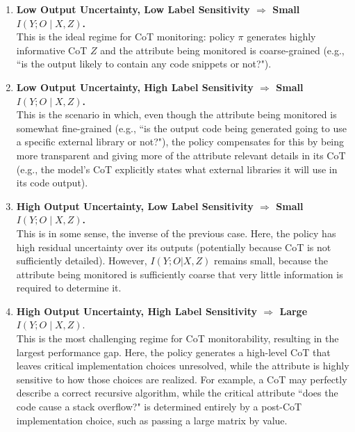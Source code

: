 \documentclass{article}
\theoremstyle{plain}
\begin{document}
\begin{enumerate}
\item \textbf{Low Output Uncertainty, Low Label Sensitivity $\Rightarrow$ Small $I(Y;O\mid X,Z)$.} \\
This is the ideal regime for CoT monitoring: policy $\pi$ generates highly informative CoT $Z$
and the attribute being monitored is coarse-grained (e.g., ``is the output likely to contain any code snippets or not?"). 

\item \textbf{Low Output Uncertainty, High Label Sensitivity $\Rightarrow$ Small $I(Y;O\mid X,Z)$.} \\
This is the scenario in which, even though the attribute being monitored is somewhat fine-grained (e.g., ``is the output code being generated going to use a specific external library or not?"), the policy compensates for this by being more transparent and giving more of the attribute relevant details in its CoT (e.g., the model's CoT explicitly states what external libraries it will use in its code output).

\item \textbf{High Output Uncertainty, Low Label Sensitivity $\Rightarrow$ Small $I(Y;O\mid X,Z)$.} \\
This is in some sense, the inverse of the previous case.
Here, the policy has high residual uncertainty over its outputs (potentially because CoT is not sufficiently detailed). However, $I(Y;O|X,Z)$ remains small, because the attribute being monitored is sufficiently coarse that very little information is required to determine it.


\item \textbf{High Output Uncertainty, High Label Sensitivity $\Rightarrow$ Large $I(Y;O\mid X,Z)$}. \\
This is the most challenging regime for CoT monitorability, resulting in the largest performance gap.
Here, the policy generates a high-level CoT that leaves critical implementation choices unresolved, while the attribute is highly sensitive to how those choices are realized.
For example, a CoT may perfectly describe a correct recursive algorithm, while the critical attribute ``does the code cause a stack overflow?" is determined entirely by a post-CoT implementation choice, such as passing a large matrix by value.
\end{enumerate}
\end{document}
